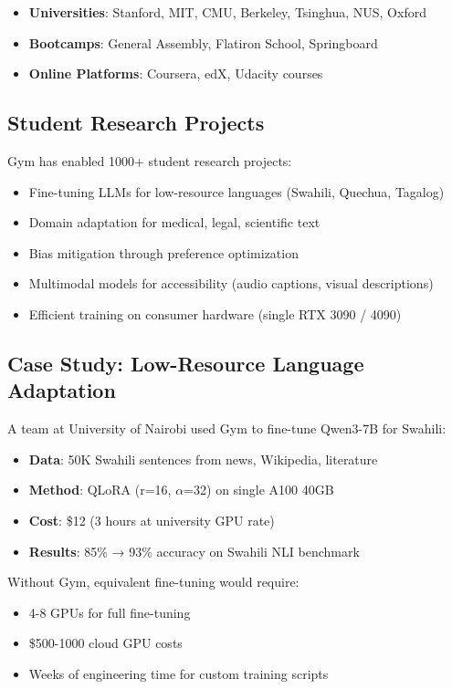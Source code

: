 \documentclass[11pt,letterpaper]{article}
\begin{document}
\begin{itemize}
\item \textbf{Universities}: Stanford, MIT, CMU, Berkeley, Tsinghua, NUS, Oxford
\item \textbf{Bootcamps}: General Assembly, Flatiron School, Springboard
\item \textbf{Online Platforms}: Coursera, edX, Udacity courses
\end{itemize}

\subsection{Student Research Projects}

Gym has enabled 1000+ student research projects:

\begin{itemize}
\item Fine-tuning LLMs for low-resource languages (Swahili, Quechua, Tagalog)
\item Domain adaptation for medical, legal, scientific text
\item Bias mitigation through preference optimization
\item Multimodal models for accessibility (audio captions, visual descriptions)
\item Efficient training on consumer hardware (single RTX 3090 / 4090)
\end{itemize}

\subsection{Case Study: Low-Resource Language Adaptation}

A team at University of Nairobi used Gym to fine-tune Qwen3-7B for Swahili:

\begin{itemize}
\item \textbf{Data}: 50K Swahili sentences from news, Wikipedia, literature
\item \textbf{Method}: QLoRA (r=16, $\alpha$=32) on single A100 40GB
\item \textbf{Cost}: \$12 (3 hours at university GPU rate)
\item \textbf{Results}: 85\% → 93\% accuracy on Swahili NLI benchmark
\end{itemize}

Without Gym, equivalent fine-tuning would require:
\begin{itemize}
\item 4-8 GPUs for full fine-tuning
\item \$500-1000 cloud GPU costs
\item Weeks of engineering time for custom training scripts
\end{itemize}
\end{document}
